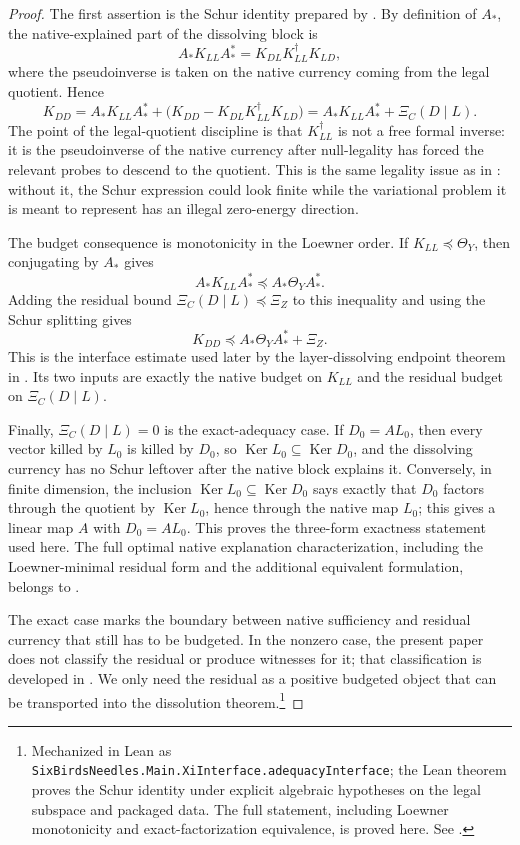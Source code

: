 \documentclass[11pt]{article}
\DeclareMathOperator{\Ker}{Ker}
\newcommand{\XiRes}{\Xi}
\newcommand{\preceqq}{\preceq}
\theoremstyle{definition}
\begin{document}
\begin{proof}
The first assertion is the Schur identity prepared by
.  By definition of \(A_*\), the native-explained
part of the dissolving block is
\[
  A_*K_{LL}A_*^*
  =K_{DL}K_{LL}^\dagger K_{LD},
\]
where the pseudoinverse is taken on the native currency coming from the
legal quotient.  Hence
\[
  K_{DD}
  =A_*K_{LL}A_*^*
   +\bigl(K_{DD}-K_{DL}K_{LL}^\dagger K_{LD}\bigr)
  =A_*K_{LL}A_*^*+\XiRes_C(D\mid L).
\]
The point of the legal-quotient discipline is that \(K_{LL}^\dagger\)
is not a free formal inverse: it is the pseudoinverse of the native
currency after null-legality has forced the relevant probes to descend
to the quotient.  This is the same legality issue as in
: without it, the Schur expression could look finite
while the variational problem it is meant to represent has an illegal
zero-energy direction.

The budget consequence is monotonicity in the Loewner order.  If
\(K_{LL}\preceqq\Theta_Y\), then conjugating by \(A_*\) gives
\[
  A_*K_{LL}A_*^*\preceqq A_*\Theta_YA_*^*.
\]
Adding the residual bound
\(\XiRes_C(D\mid L)\preceqq\Xi_Z\) to this inequality and using the
Schur splitting gives
\[
  K_{DD}\preceqq A_*\Theta_YA_*^*+\Xi_Z.
\]
This is the interface estimate used later by the layer-dissolving
endpoint theorem in .  Its two inputs are
exactly the native budget on \(K_{LL}\) and the residual budget on
\(\XiRes_C(D\mid L)\).

Finally, \(\XiRes_C(D\mid L)=0\) is the exact-adequacy case.
If \(D_0=AL_0\), then every vector killed by \(L_0\) is killed by
\(D_0\), so \(\Ker L_0\subseteq\Ker D_0\), and the dissolving currency
has no Schur leftover after the native block explains it.  Conversely,
in finite dimension, the inclusion
\(\Ker L_0\subseteq\Ker D_0\) says exactly that \(D_0\) factors through
the quotient by \(\Ker L_0\), hence through the native map \(L_0\);
this gives a linear map \(A\) with \(D_0=AL_0\).  This proves the
three-form exactness statement used here.  The full optimal native
explanation characterization, including the Loewner-minimal residual
form and the additional equivalent formulation, belongs to
\citet{Tsiokos2026XiCompanion}.

The exact case marks the boundary between native sufficiency and
residual currency that still has to be budgeted.  In the nonzero case,
the present paper does not classify the residual or produce witnesses
for it; that classification is developed in
\citet{Tsiokos2026XiCompanion}.  We only need the residual as a positive
budgeted object that can be transported into the dissolution theorem.\footnote{Mechanized in Lean as
\texttt{SixBirdsNeedles.Main.XiInterface.adequacyInterface}; the Lean
theorem proves the Schur identity under explicit algebraic hypotheses
on the legal subspace and packaged data.  The full statement, including
Loewner monotonicity and exact-factorization equivalence, is proved
here.  See .}
\end{proof}
\end{document}
